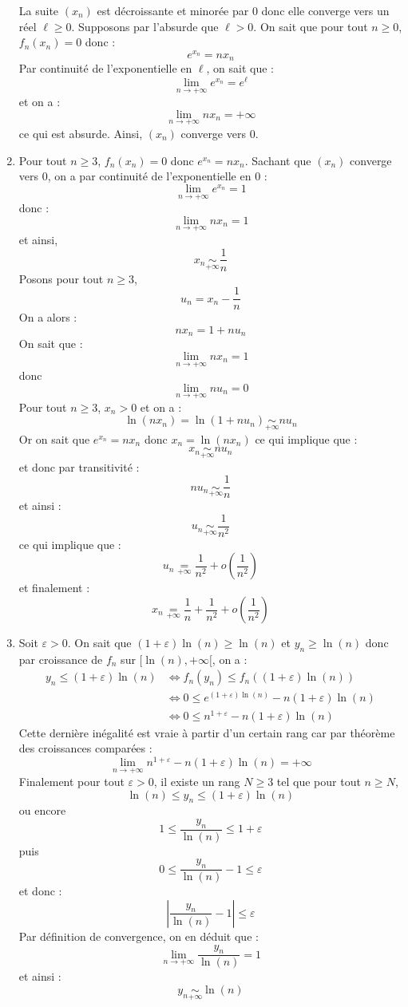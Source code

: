 \documentclass[a4paper,twoside,french,10pt]{VcCours}
\begin{document}
\begin{enumerate}
\noindent La suite $(x_n)$ est décroissante et minorée par $0$ donc elle converge vers un réel $\ell \geq 0$. Supposons par l'absurde que $\ell>0$. On sait que pour tout $n \geq 0$, $f_n(x_n)=0$ donc :
$$e^{x_n} = nx_n$$
Par continuité de l'exponentielle en $\ell$, on sait que :
$$ \lim_{n \rightarrow + \infty} e^{x_n} = e^{\ell}$$
et on a :
$$ \lim_{n \rightarrow + \infty} nx_n = + \infty$$
ce qui est absurde. Ainsi, $(x_n)$ converge vers $0$.
\item Pour tout $n \geq 3$, $f_n(x_n)=0$ donc $e^{x_n} = nx_n$. Sachant que $(x_n)$ converge vers $0$, on a par continuité de l'exponentielle en $0$ :
$$ \lim_{n \rightarrow + \infty} e^{x_n} = 1$$
donc :
$$ \lim_{n \rightarrow + \infty} n x_n = 1$$
et ainsi,
$$x_n \underset{+ \infty}{\sim} \dfrac{1}{n}$$
Posons pour tout $n \geq 3$,
$$ u_n = x_n - \dfrac{1}{n}$$
On a alors :
$$ nx_n =1+n u_n $$
On sait que :
$$ \lim_{n \rightarrow + \infty} n x_n = 1$$
donc 
$$ \lim_{n \rightarrow + \infty} n u_n = 0$$
Pour tout $n \geq 3$, $x_n >0$ et on a :
$$ \ln(nx_n) = \ln(1+n u_n) \underset{+ \infty}{\sim} n u_n$$
Or on sait que $e^{x_n}=nx_n$ donc $x_n = \ln(nx_n)$ ce qui implique que :
$$ x_n \underset{+ \infty}{\sim} n u_n $$
et donc par transitivité :
$$ n u_n \underset{+ \infty}{\sim}  \dfrac{1}{n}$$
et ainsi :
$$ u_n \underset{+ \infty}{\sim}  \dfrac{1}{n^2}$$
ce qui implique que :
$$ u_n \underset{+ \infty}{=} \dfrac{1}{n^2} + o \left( \dfrac{1}{n^2} \right)$$
et finalement :
$$ x_n  \underset{+ \infty}{=} \dfrac{1}{n} + \dfrac{1}{n^2} + o \left( \dfrac{1}{n^2} \right)$$
\item Soit $\varepsilon >0$. On sait que $(1+ \varepsilon) \ln(n) \geq \ln(n)$ et $y_n \geq \ln(n)$ donc par croissance de $f_n$ sur $[\ln(n), + \infty[$, on a :
\begin{align*}
y_n \leq (1+ \varepsilon) \ln(n)&  \Longleftrightarrow f_n(y_n) \leq f_n((1+ \varepsilon) \ln(n)) \\
 & \Longleftrightarrow 0 \leq e^{(1+ \varepsilon) \ln(n)} - n (1+ \varepsilon) \ln(n) \\
 & \Longleftrightarrow 0 \leq n^{1+ \varepsilon} - n(1+ \varepsilon) \ln(n) 
 \end{align*}
Cette dernière inégalité est vraie à partir d'un certain rang car par théorème des croissances comparées :
$$ \lim_{n \rightarrow + \infty}  n^{1+ \varepsilon} - n(1+ \varepsilon) \ln(n)  = + \infty$$
Finalement pour tout $\varepsilon>0$, il existe un rang $N \geq 3$ tel que pour tout $n \geq N$,
$$ \ln(n) \leq y_n \leq (1+ \varepsilon) \ln(n)$$
ou encore 
$$ 1 \leq \dfrac{y_n}{\ln(n)} \leq 1+ \varepsilon$$
puis 
$$ 0 \leq \dfrac{y_n}{\ln(n)} - 1 \leq \varepsilon$$
et donc :
$$ \left\vert \dfrac{y_n}{\ln(n)} - 1 \right\vert \leq \varepsilon$$
Par définition de convergence, on en déduit que :
$$ \lim_{n \rightarrow + \infty} \dfrac{y_n}{\ln(n)} = 1$$
et ainsi :
$$ y_n \underset{+ \infty}{\sim} \ln(n)$$

\end{enumerate}
\end{document}
